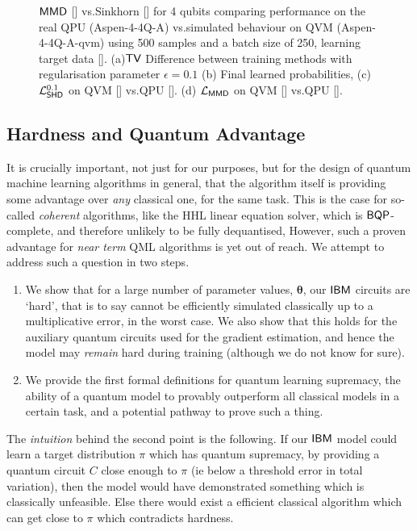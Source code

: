 \begin{figure}[ht]
    \caption{$\operatorname{\textsf{MMD}}$ [\crule[ForestGreen]{0.2cm}{0.2cm}] vs.\@ Sinkhorn [\crule[blue]{0.2cm}{0.2cm}] for 4 qubits comparing performance on the real QPU ({\selectfont Aspen-4-4Q-A}) vs.\@ simulated behaviour on QVM ({\selectfont Aspen-4-4Q-A-qvm}) using 500 samples and a batch size of 250, learning target data [\crule[black]{0.2cm}{0.2cm}]. (a)$\operatorname{\textsf{TV}}$ Difference between training methods with regularisation parameter $\epsilon = 0.1$ (b) Final learned probabilities, (c) $\mathcal{L}^{0.1}_{\operatorname{\textsf{SHD}}}$ on QVM  [\crule[blue]{0.2cm}{0.2cm}] vs.\@ QPU  [\crule[cyan]{0.2cm}{0.2cm}]. (d) $\mathcal{L}_{\operatorname{\textsf{MMD}}}$ on QVM  [\crule[ForestGreen]{0.2cm}{0.2cm}] vs.\@ QPU  [\crule[cyan]{0.2cm}{0.2cm}]. }\label{fig:MMDvSink4_real}
\end{figure}


\subsection*{Hardness and Quantum Advantage}
It is crucially important, not just for our purposes, but for the design of quantum machine learning algorithms in general, that the algorithm itself is providing some advantage over \textit{any} classical one, for the same task. This is the case for so-called \textit{coherent} algorithms, like the HHL linear equation solver\cite{harrow_quantum_2009}, which is $\textsf{BQP}$-complete, and therefore unlikely to be fully dequantised, 
However, such a proven advantage for \textit{near term} QML algorithms is yet out of reach. We attempt to address such a question in two steps. 
\begin{enumerate}
    \item We show that for a large number of parameter values, $\boldsymbol\theta$, our $\textsf{IBM}$ circuits are `hard', that is to say cannot be efficiently simulated classically up to a multiplicative error, in the worst case. We also show that this holds for the auxiliary quantum circuits used for the gradient estimation, and hence the model may \textit{remain} hard during training (although we do not know for sure).
    \item We provide the first formal definitions for quantum learning supremacy, the ability of a quantum model to provably outperform all classical models in a certain task, and a potential pathway to prove such a thing.
\end{enumerate}

The \emph{intuition} behind the second point is the following. If our $\textsf{IBM}$ model could %
learn a target distribution $\pi$ which has %
quantum supremacy, 
by providing a quantum circuit $C$ close enough to $\pi$ 
(ie below a threshold error in total variation),
then the model would have demonstrated something which is classically unfeasible. Else there would exist a efficient classical algorithm 
which can get close to $\pi$ which contradicts hardness.

